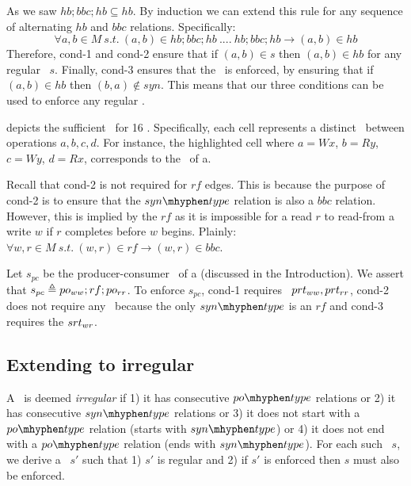 As we saw $hb;bbc;hb \subseteq hb$. By induction we can extend this rule for any sequence of alternating $hb$ and $bbc$ relations. Specifically:
\begin{equation*}
\forall a,b \in M\ s.t.\ (a, b) \in hb;bbc;hb\ ....\ hb;bbc;hb \rightarrow (a,b) \in hb
\end{equation*}
Therefore, cond-1 and cond-2 ensure that if $(a, b) \in s$ then $(a,b) \in hb$ for any regular \synpat\ $s$. Finally, cond-3 ensures that the \synpat\ is enforced, by ensuring that if $(a,b) \in hb$ then $(b,a) \notin syn$.
This means that our three conditions can be used to enforce any regular \synpat.

 depicts the sufficient \rts\ for 16 \synpats. Specifically, each cell represents a distinct \synpat\ between operations $a,b,c,d$. For instance, the highlighted cell where $a = Wx$, $b = Ry$, $c = Wy$, $d = Rx$, corresponds to the \synpat\ of a.

Recall that cond-2 is not required for $rf$ edges. This is because the purpose of cond-2 is to ensure that the $\syntype$ relation is also a $bbc$ relation. However, this is implied by the $rf$ as it is impossible for a read $r$ to read-from a write $w$ if $r$ completes before $w$ begins. Plainly: 
$\forall w,r \in M\ s.t.\  (w,r) \in rf \rightarrow (w,r) \in bbc $.
    
Let $s_{pc}$ be the producer-consumer \synpat\ of a (discussed in the Introduction). We assert that $s_{pc} \triangleq po_{ww}; rf;po_{rr}$. To enforce $s_{pc}$, cond-1 requires \prts\ $prt_{ww}, prt_{rr}$, cond-2 does not require any \srt\ because the only $\syntype$ is an $rf$ and cond-3 requires the $srt_{wr}$.




\subsection{Extending to irregular \synpats}\label{sec:rt-cons:irreg}

A \synpat\ is deemed \emph{irregular} if 1) it has consecutive $\potype$ relations or 2) it has consecutive $\syntype$ relations or 3) it does not start with a $\potype$ relation (\ie starts with $\syntype$) or 4) it does not end with a $\potype$ relation (\ie ends with $\syntype$).
For each such \synpat\ $s$, we derive a \synpat\ $s'$ such that 1) $s'$ is regular and 2) if $s'$ is enforced then $s$ must also be enforced.



